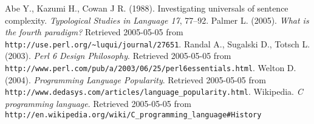 \documentclass[12pt]{article}
\begin{document}
\begin{thebibliography}{4in}
 Abe Y., Kazumi H., Cowan J R. (1988).
Investigating universals of sentence complexity.  \textit{Typological
Studies in Language 17}, 77--92.
 Palmer L. (2005).  \textit{What is the fourth
paradigm?}  Retrieved 2005-05-05 from 
\verb+http://use.perl.org/~luqui/journal/27651+.
 Randal A., Sugalski D., T\:otsch
L. (2003).  \textit{Perl 6 Design Philosophy}.  Retrieved 2005-05-05
from \verb+http://www.perl.com/pub/a/2003/06/25/perl6essentials.html+.
 Welton D. (2004). \textit{Programming Language
Popularity}.  Retrieved 2005-05-05 from
\verb+http://www.dedasys.com/articles/language_popularity.html+.
 Wikipedia.  \textit{C programming
language}.  Retrieved 2005-05-05 from 
\verb+http://en.wikipedia.org/wiki/C_programming_language#History+
\end{thebibliography}
\end{document}
